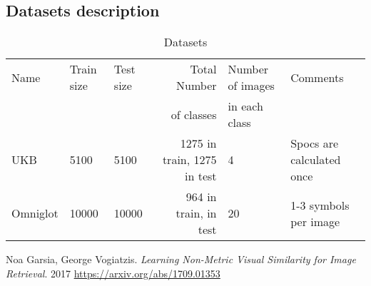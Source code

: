 \documentclass[10pt,a4paper]{article}
\begin{document}
    \subsection{Datasets description}\label{subsec:datasetsDescription}

    \begin{table}[h!]
        \label{table:datasets_table}
        \caption{Datasets}
        \begin{tabular}{|l|l|l|r|l|l|}
            \hline
            Name & Train size & Test size & Total Number & Number of images & Comments                  \\
            & & & of classes & in each class &                           \\ \hline
            UKB & 5100 & 5100 & 1275 in train, 1275 in test & 4 & Spocs are calculated once \\ \hline
            Omniglot & 10000 & 10000 & 964 in train, \space659 in test & 20 & 1-3 symbols per image      \\ \hline
        \end{tabular}
    \end{table}


    \begin{thebibliography}{9}

        Noa Garsia, George Vogiatzis.
        \textit{Learning Non-Metric Visual Similarity for Image Retrieval}. 2017
        \url{https://arxiv.org/abs/1709.01353}

    \end{thebibliography}
\end{document}
